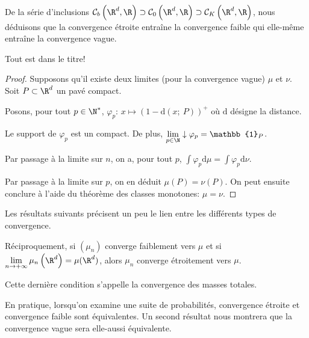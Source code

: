 \begin{prop}
De la série d'inclusions $\mathcal{C}_b\left(\R^d,\R\right) \supset \mathcal{C}_0\left(\R^d,\R\right) \supset \mathcal{C}_K\left(\R^d,\R\right)$, nous déduisons que la convergence étroite entraîne la convergence faible qui elle-même entraîne la convergence vague.
\end{prop}

\begin{prop}
Tout est dans le titre!
\end{prop}

\begin{proof}
Supposons qu'il existe deux limites (pour la convergence vague) $\mu$ et $\nu$. Soit $P \subset \R^d$ un pavé compact.

\medskip
Posons, pour tout $p \in \N^*$, $\varphi_p: \, x \mapsto \left ( 1-\mathrm{d}(x;~P)\right )^+$ où $\mathrm d$ désigne la distance.

Le support de $\varphi_p$ est un compact. De plus, $\lim \limits_{p \in \N} \downarrow \varphi_p = \mathbb{1}_P$.

Par passage à la limite sur $n$, on a, pour tout $p$, $\int \varphi_p \mathrm d \mu = \int \varphi_p \mathrm d \nu$.

Par passage à la limite sur $p$, on en déduit $\mu(P) = \nu(P)$. On peut ensuite conclure à l'aide du théorème des classes monotones: $\mu = \nu$.
\end{proof}

Les résultats suivants précisent un peu le lien entre les différents types de convergence.

\begin{theo}
Réciproquement, si $(\mu_n)$ converge faiblement vers $\mu$ et si $\lim \limits_{n \to +\infty} \mu_n\left(\R^d\right) = \mu(\R^d)$, alors $\mu_n$ converge étroitement vers $\mu$.
\end{theo}

Cette dernière condition s'appelle la convergence des masses totales.

\begin{cerveau}
En pratique, lorsqu'on examine une suite de probabilités, convergence étroite et convergence faible sont équivalentes. Un second résultat nous montrera que la convergence vague sera elle-aussi équivalente.
\end{cerveau}

